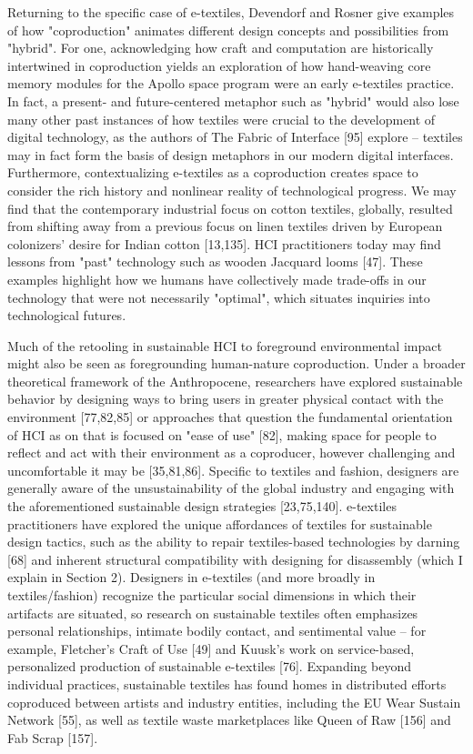 Returning to the specific case of e-textiles, Devendorf and Rosner give examples of how "coproduction" animates different design concepts and possibilities from "hybrid". For one, acknowledging how craft and computation are historically intertwined in coproduction yields an exploration of how hand-weaving core memory modules for the Apollo space program were an early e-textiles practice. In fact, a present- and future-centered metaphor such as "hybrid" would also lose many other past instances of how textiles were crucial to the development of digital technology, as the authors of The Fabric of Interface [95] explore – textiles may in fact form the basis of design metaphors in our modern digital interfaces. Furthermore, contextualizing e-textiles as a coproduction creates space to consider the rich history and nonlinear reality of technological progress. We may find that the contemporary industrial focus on cotton textiles, globally, resulted from shifting away from a previous focus on linen textiles driven by European colonizers' desire for Indian cotton [13,135]. HCI practitioners today may find lessons from "past" technology such as wooden Jacquard looms [47]. These examples highlight how we humans have collectively made trade-offs in our technology that were not necessarily "optimal", which situates inquiries into technological futures.

Much of the retooling in sustainable HCI to foreground environmental impact might also be seen as foregrounding human-nature coproduction. Under a broader theoretical framework of the Anthropocene, researchers have explored sustainable behavior by designing ways to bring users in greater physical contact with the environment [77,82,85] or approaches that question the fundamental orientation of HCI as on that is focused on "ease of use" [82], making space for people to reflect and act with their environment as a coproducer, however challenging and uncomfortable it may be [35,81,86]. Specific to textiles and fashion, designers are generally aware of the unsustainability of the global industry and engaging with the aforementioned sustainable design strategies [23,75,140]. e-textiles practitioners have explored the unique affordances of textiles for sustainable design tactics, such as the ability to repair textiles-based technologies by darning [68] and inherent structural compatibility with designing for disassembly (which I explain in Section 2). Designers in e-textiles (and more broadly in textiles/fashion) recognize the particular social dimensions in which their artifacts are situated, so research on sustainable textiles often emphasizes personal relationships, intimate bodily contact, and sentimental value -- for example, Fletcher's Craft of Use [49] and Kuusk's work on service-based, personalized production of sustainable e-textiles [76]. Expanding beyond individual practices, sustainable textiles has found homes in distributed efforts coproduced between artists and industry entities, including the EU Wear Sustain Network [55], as well as textile waste marketplaces like Queen of Raw [156] and Fab Scrap [157].

